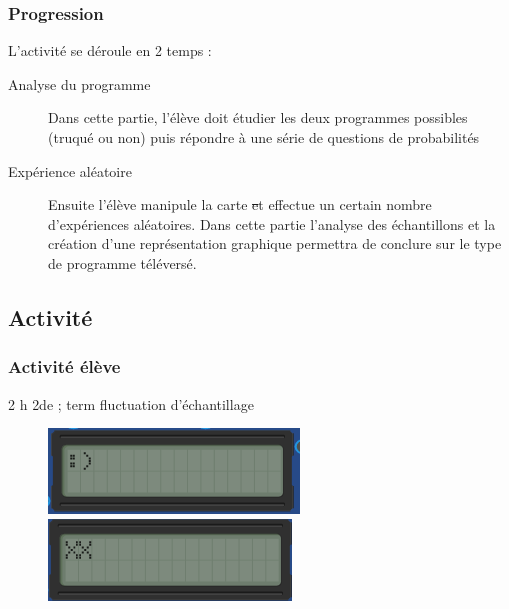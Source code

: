\subsubsection{Progression}

L'activité se déroule en 2 temps :
\begin{description}
    \item[Analyse du programme] Dans cette partie, l'élève doit étudier les deux programmes possibles (truqué ou non) puis répondre à une série de questions de probabilités
    \item[Expérience aléatoire] Ensuite l'élève manipule la carte \st et effectue un certain nombre d'expériences aléatoires. Dans cette partie l'analyse des échantillons et la création d'une représentation graphique permettra de conclure sur le type de programme téléversé.
\end{description}

%
%

\newpage

\subsection{Activité}

\subsubsection{Activité élève}

\cartouche
{2 h}         %
{2de ; term}           %
{fluctuation d'échantillage}        %
{}     %
{}       %


\begin{figure}\rule{0cm}{0.5em}
    \includegraphics[width=\linewidth]{res/st-truque-mini.png}\\
    \includegraphics[width=\linewidth]{res/st-truque-mini2.png}
\end{figure}

